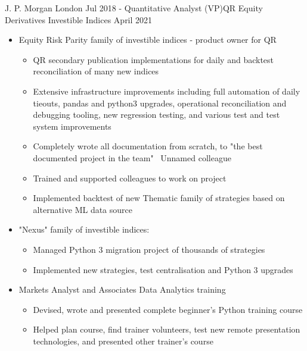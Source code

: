 %
%
%
\begin{experiences}
  \topofexperience
  	{J. P. Morgan} {London}
  \experience
    {Jul 2018 -}   {Quantitative Analyst (VP)}{QR Equity Derivatives Investible Indices}
    {April 2021} {
        \begin{itemize}
            \item Equity Risk Parity family of investible indices - product owner for QR
            
            \begin{itemize}
                \item QR secondary publication implementations for daily and backtest reconciliation of many new indices
                \item Extensive infrastructure improvements including full automation of daily tieouts, pandas and python3 upgrades, operational reconciliation and debugging tooling, new regression testing, and various test and test system improvements
                \item Completely wrote all documentation from scratch, to "the best documented project in the team" ~Unnamed colleague
                \item Trained and supported colleagues to work on project
                \item Implemented backtest of new Thematic family of strategies based on alternative ML data source
            \end{itemize}
            
            \item "Nexus" family of investible indices:

            \begin{itemize}
                \item Managed Python 3 migration project of thousands of strategies
                \item Implemented new strategies, test centralisation and Python 3 upgrades
            \end{itemize}
            
            \item Markets Analyst and Associates Data Analytics training
            \begin{itemize}
                \item Devised, wrote and presented complete beginner's Python training course
                \item Helped plan course, find trainer volunteers, test new remote presentation technologies, and presented other trainer's course
            \end{itemize}


\end{itemize}}
\end{experiences}
